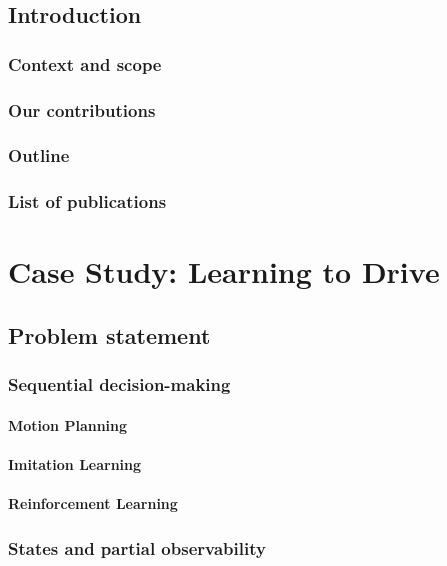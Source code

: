 \setcounter{mtc}{-1}
\adjustmtc


%

\chapter{Introduction}
\section{Context and scope}
\section{Our contributions}
\section{Outline}
\section{List of publications}
\part{Case Study: Learning to Drive}
\chapter{Problem statement}
\section{Sequential decision-making}
\subsection*{Motion Planning}
\subsection*{Imitation Learning}
\subsection*{Reinforcement Learning}
\section{States and partial observability}
